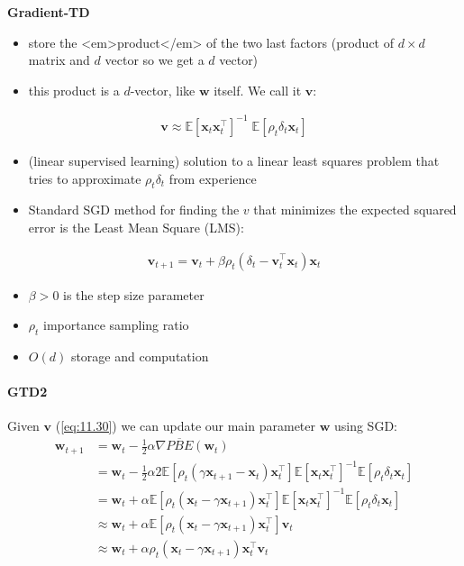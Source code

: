 \documentclass[sutton_barto_notes.tex]{subfiles}
\begin{document}
 \textbf{Gradient-TD}  
\begin{itemize}
\item store the <em>product</em> of the two last factors (product of $d \times d$ matrix and $d$ vector so we get a $d$ vector) 
\item this product is a $d$-vector, like $\mathbf{w}$ itself. We call it $\mathbf{v}$: 
\end{itemize}

\begin{align}
\mathbf{v} \approx \mathbb{E}[\mathbf{x}_t \mathbf{x}_t^{\top}]^{-1} \; \mathbb{E}[\rho_t \delta_t \mathbf{x}_t] \label{eq:11.29}\tag{11.29}
\end{align}
\begin{itemize}
\item (linear supervised learning) solution to a linear least squares problem that tries to approximate $\rho_t \delta_t$ from experience 
\item Standard SGD method for finding the $v$ that minimizes the expected squared error is the Least Mean Square (LMS): 
\end{itemize}
\begin{align}
\mathbf{v}_{t+1} = \mathbf{v}_t + \beta \rho_t (\delta_t - \mathbf{v}_t^{\top} \mathbf{x}_t) \mathbf{x}_t \label{eq:11.30}\tag{11.30}
\end{align}

\begin{itemize}
\item $\beta > 0$ is the step size parameter 
\item $\rho_t$ importance sampling ratio 
\item $O(d)$ storage and computation 
\end{itemize}
 \paragraph{GTD2} 
Given $\mathbf{v}$ (\ref{eq:11.30}) we can update our main parameter $\mathbf{w}$ using SGD: 
\begin{align}
\mathbf{w}_{t+1} & = \mathbf{w}_{t} - \frac{1}{2} \alpha \nabla \overline{PBE}(\mathbf{w}_{t}) \label{eq:11.31}\tag{11.31}\\
 & = \mathbf{w}_{t} - \frac{1}{2} \alpha 2 \mathbb{E} [\rho_t(\gamma \mathbf{x}_{t+1} - \mathbf{x}_{t}) \mathbf{x}_{t}^{\top}] \mathbb{E}[\mathbf{x}_{t} \mathbf{x}_{t}^{\top}]^{-1} \mathbb{E}[\rho_t \delta_t \mathbf{x}_{t}] \label{eq:11.32}\tag{11.32}\\
 & = \mathbf{w}_{t} + \alpha \mathbb{E} [\rho_t(\mathbf{x}_{t} - \gamma \mathbf{x}_{t+1}) \mathbf{x}_{t}^{\top}] \mathbb{E}[\mathbf{x}_{t} \mathbf{x}_{t}^{\top}]^{-1} \mathbb{E}[\rho_t \delta_t \mathbf{x}_{t}] \label{eq:11.33}\tag{11.33}\\
  & \approx \mathbf{w}_{t} + \alpha \mathbb{E} [\rho_t(\mathbf{x}_{t} - \gamma \mathbf{x}_{t+1}) \mathbf{x}_{t}^{\top}] \mathbf{v}_t \label{eq:11.34}\tag{11.34}\\
  & \approx \mathbf{w}_{t} + \alpha \rho_t(\mathbf{x}_{t} - \gamma \mathbf{x}_{t+1}) \mathbf{x}_{t}^{\top} \mathbf{v}_t \label{eq:11.35}\tag{11.35}
\end{align} 
\end{document}

